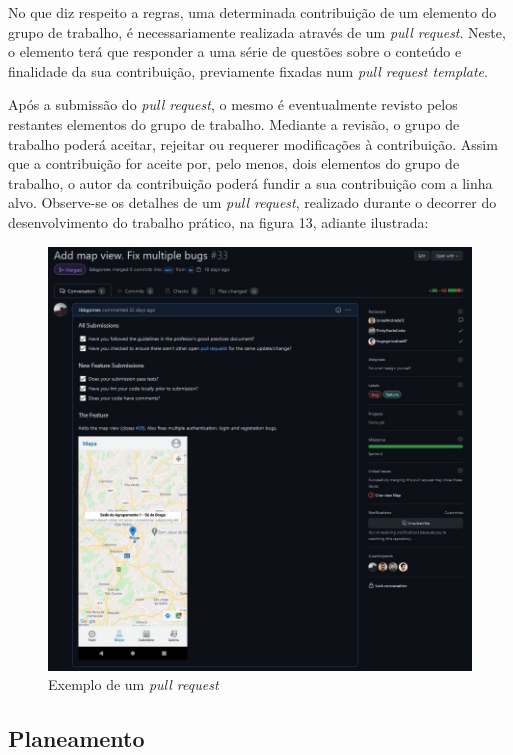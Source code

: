 \documentclass[12pt]{report}
\begin{document}
No que diz respeito a regras, uma determinada contribuição de um elemento do grupo de trabalho, é necessariamente realizada através de um \textit{pull request}. Neste, o elemento terá que responder a uma série de questões sobre o conteúdo e finalidade da sua contribuição, previamente fixadas num \textit{pull request template}. 

Após a submissão do \textit{pull request}, o mesmo é eventualmente revisto pelos restantes elementos do grupo de trabalho. Mediante a revisão, o grupo de trabalho poderá aceitar, rejeitar ou requerer modificações à contribuição. Assim que a contribuição for aceite por, pelo menos, dois elementos do grupo de trabalho, o autor da contribuição poderá fundir a sua contribuição com a linha alvo. Observe-se os detalhes de um \textit{pull request}, realizado durante o decorrer do desenvolvimento do trabalho prático, na figura 13, adiante ilustrada:

\bigskip
\begin{figure}[H]
    \centering
    \includegraphics[width=1\textwidth]{pull-request.png.jpg}
    \caption{Exemplo de um \textit{pull request}}
\end{figure}

\subsection{Planeamento}
\end{document}
